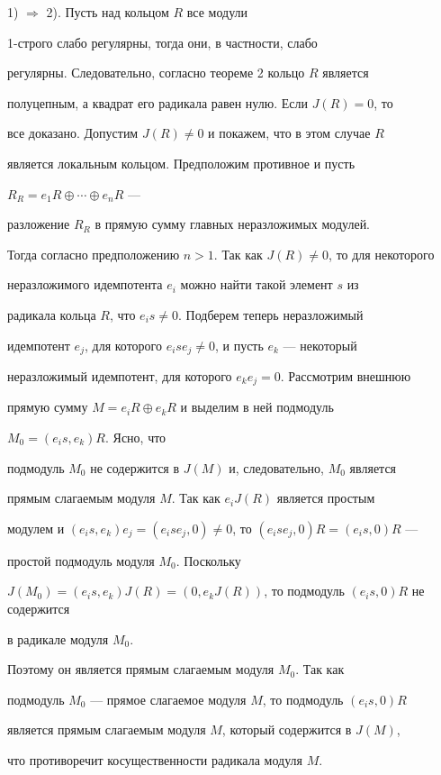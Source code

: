 \begin{pf} 


1) $\Rightarrow$ 2). Пусть над кольцом $R$ все модули 


1-строго слабо регулярны, тогда они, в частности, слабо 


регулярны. Следовательно, согласно теореме 2 кольцо $R$ является 


полуцепным, а квадрат его радикала равен нулю. Если $J(R)=0$, то 


все доказано. Допустим $J(R)\ne0$ и покажем, что в этом случае $R$ 


является локальным кольцом. Предположим противное и пусть 


$R_R=e_1R\oplus\dotsb\oplus e_n R$ --- 


разложение $R_R$ в прямую сумму главных неразложимых модулей. 


Тогда согласно предположению $n>1$. Так как $J(R)\ne0$, то для некоторого 


неразложимого идемпотента $e_i$ можно найти такой элемент $s$ из 


радикала кольца $R$, что $e_is\ne0$. Подберем теперь неразложимый 


идемпотент $e_j$, для которого $e_ise_j\ne0$, и пусть $e_k$ --- некоторый 


неразложимый идемпотент, для которого $e_ke_j=0$. Рассмотрим внешнюю 


прямую сумму $M=e_iR\oplus e_kR$ и выделим в ней подмодуль 


$M_0=(e_is,e_k)R$. Ясно, что 


подмодуль $M_0$ не содержится в $J(M)$ и, следовательно, $M_0$ является 


прямым слагаемым модуля $M$. Так как $e_iJ(R)$ является простым 


модулем и $(e_is,e_k)e_j=(e_ise_j,0)\ne0$, то $(e_ise_j,0)R=(e_is,0)R$ --- 


простой подмодуль модуля $M_0$. Поскольку 


$J(M_0)=(e_is,e_k)J(R)=(0,e_kJ(R))$, то подмодуль $(e_is,0)R$ не содержится 


в радикале модуля $M_0$. 


Поэтому он является прямым слагаемым модуля $M_0$. Так как 


подмодуль $M_0$ --- прямое слагаемое модуля $M$, то подмодуль $(e_is,0)R$ 


является прямым слагаемым модуля $M$, который содержится в $J(M)$, 


что противоречит косущественности радикала модуля $M$. 



\end{pf}
